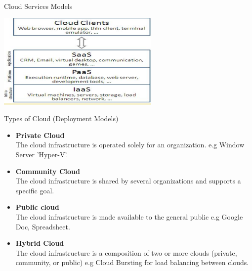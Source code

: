 \documentclass{SKP-beamer}
\begin{document}
\begin{frame}{Cloud Services Models}
	
	\includegraphics[scale=1.5]{12.png}
	
\end{frame}



\begin{frame}{Types of Cloud (Deployment Models)}
	\begin{itemize}
		
		\item  \textbf{Private Cloud} \\
		The cloud infrastructure is operated solely for an organization.
		e.g Window Server 'Hyper-V'. \\
		
		\item  \textbf{Community Cloud} \\
		The cloud infrastructure is shared by several organizations and supports a specific goal.
		
		\item \textbf{Public cloud} \\
		The cloud infrastructure is made available to the general public
		e.g Google Doc, Spreadsheet.
		\item \textbf{Hybrid Cloud} \\
		The cloud infrastructure is a composition of two or more clouds (private, community, or public)
		e.g Cloud Bursting for load balancing between clouds.
		
	\end{itemize}
\end{frame}
\end{document}
